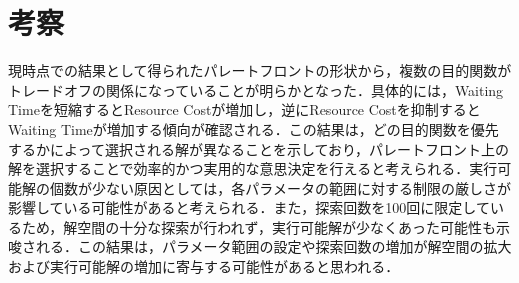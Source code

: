 \section{考察}
現時点での結果として得られたパレートフロントの形状から，複数の目的関数がトレードオフの関係になっていることが明らかとなった．具体的には，Waiting Timeを短縮するとResource Costが増加し，逆にResource Costを抑制するとWaiting Timeが増加する傾向が確認される．この結果は，どの目的関数を優先するかによって選択される解が異なることを示しており，パレートフロント上の解を選択することで効率的かつ実用的な意思決定を行えると考えられる．実行可能解の個数が少ない原因としては，各パラメータの範囲に対する制限の厳しさが影響している可能性があると考えられる．また，探索回数を100回に限定しているため，解空間の十分な探索が行われず，実行可能解が少なくあった可能性も示唆される．この結果は，パラメータ範囲の設定や探索回数の増加が解空間の拡大および実行可能解の増加に寄与する可能性があると思われる．
